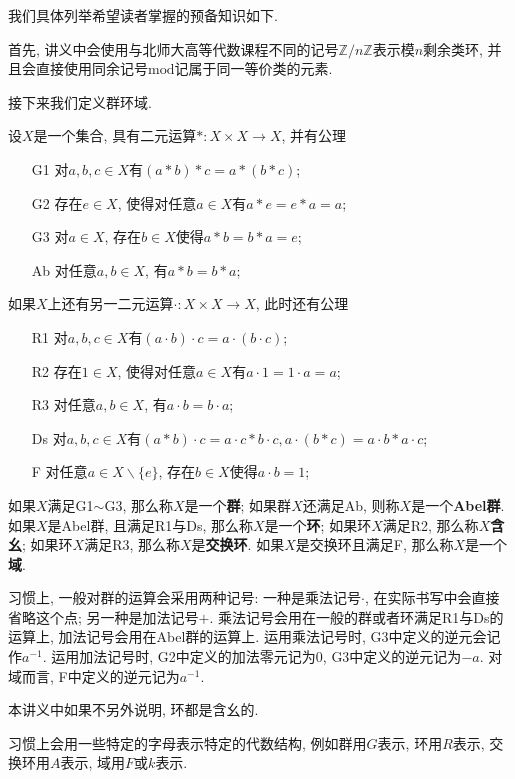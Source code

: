 我们具体列举希望读者掌握的预备知识如下.

首先, 讲义中会使用与北师大高等代数课程不同的记号$\mathbb{Z}/n\mathbb{Z}$表示模$n$剩余类环, 并且会直接使用同余记号$\mathrm{mod}$记属于同一等价类的元素.

接下来我们定义群环域.
\begin{defn}设$X$是一个集合, 具有二元运算$*:X\times X\to X$, 并有公理
    \begin{itemize}
        \item[G1] 对$a,b,c\in X$有$(a*b)*c=a*(b*c)$;
        \item[G2] 存在$e\in X$, 使得对任意$a\in X$有$a*e=e*a=a$;
        \item[G3] 对$a\in X$, 存在$b\in X$使得$a*b=b*a=e$;
        \item[Ab] 对任意$a,b\in X$, 有$a*b=b*a$;
    \end{itemize}
    如果$X$上还有另一二元运算$\cdot:X\times X\to X$, 此时还有公理
    \begin{itemize}
        \item[R1] 对$a,b,c\in X$有$(a\cdot b)\cdot c=a\cdot(b\cdot c)$;
        \item[R2] 存在$1\in X$, 使得对任意$a\in X$有$a\cdot 1=1\cdot a=a$;
        \item[R3] 对任意$a,b\in X$, 有$a\cdot b=b\cdot a$;
        \item[Ds] 对$a,b,c\in X$有$(a*b)\cdot c=a\cdot c*b\cdot c, a\cdot(b*c)=a\cdot b*a\cdot c$;
        \item[F] 对任意$a\in X\backslash\{e\}$, 存在$b\in X$使得$a\cdot b=1$;
    \end{itemize}
    如果$X$满足G1$\sim$G3, 那么称$X$是一个\textbf{群}; 如果群$X$还满足Ab, 则称$X$是一个\textbf{Abel群}.
    如果$X$是Abel群, 且满足R1与Ds, 那么称$X$是一个\textbf{环}; 如果环$X$满足R2, 那么称$X$\textbf{含幺}; 如果环$X$满足R3, 那么称$X$是\textbf{交换环}.
    如果$X$是交换环且满足F, 那么称$X$是一个\textbf{域}.
\end{defn}

\begin{sym}
    习惯上, 一般对群的运算会采用两种记号: 一种是乘法记号$\cdot$, 在实际书写中会直接省略这个点; 另一种是加法记号$+$.
    乘法记号会用在一般的群或者环满足R1与Ds的运算上, 加法记号会用在Abel群的运算上.
    运用乘法记号时, G3中定义的逆元会记作$a^{-1}$.
    运用加法记号时, G2中定义的加法零元记为$0$, G3中定义的逆元记为$-a$.
    对域而言, F中定义的逆元记为$a^{-1}$.

    本讲义中如果不另外说明, 环都是含幺的.

    习惯上会用一些特定的字母表示特定的代数结构, 例如群用$G$表示, 环用$R$表示, 交换环用$A$表示, 域用$F$或$k$表示.
\end{sym}

